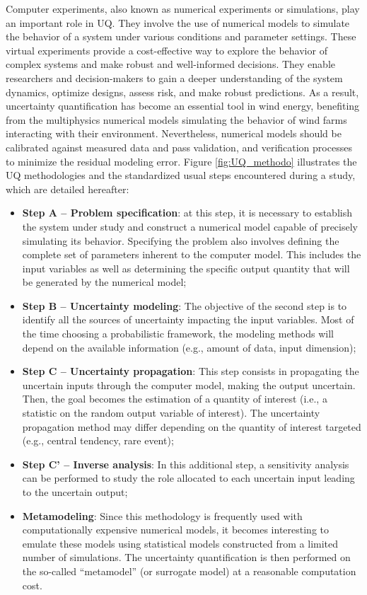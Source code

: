 Computer experiments, also known as numerical experiments or simulations, play an important role in UQ. 
They involve the use of numerical models to simulate the behavior of a system under various conditions and parameter settings. 
These virtual experiments provide a cost-effective way to explore the behavior of complex systems and make robust and well-informed decisions.
They enable researchers and decision-makers to gain a deeper understanding of the system dynamics, optimize designs, assess risk, and make robust predictions. 
As a result, uncertainty quantification has become an essential tool in wind energy, benefiting from the multiphysics numerical models simulating the behavior of wind farms interacting with their environment.
Nevertheless, numerical models should be calibrated against measured data and pass validation, and verification processes to minimize the residual modeling error.
Figure \ref{fig:UQ_methodo} illustrates the UQ methodologies and the standardized usual steps encountered during a study, which are detailed hereafter: 
\begin{itemize}
    \item \textbf{Step A -- Problem specification}: at this step, it is necessary to establish the system under study and construct a numerical model capable of precisely simulating its behavior.
    Specifying the problem also involves defining the complete set of parameters inherent to the computer model. 
    This includes the input variables as well as determining the specific output quantity that will be generated by the numerical model;
    \item \textbf{Step B -- Uncertainty modeling}: The objective of the second step is to identify all the sources of uncertainty impacting the input variables.
    Most of the time choosing a probabilistic framework, the modeling methods will depend on the available information (e.g., amount of data, input dimension);
    \item \textbf{Step C -- Uncertainty propagation}: This step consists in propagating the uncertain inputs through the computer model, making the output uncertain. 
    Then, the goal becomes the estimation of a quantity of interest (i.e., a statistic on the random output variable of interest).
    The uncertainty propagation method may differ depending on the quantity of interest targeted (e.g., central tendency, rare event);    
    \item \textbf{Step C' -- Inverse analysis}: In this additional step, a sensitivity analysis can be performed to study the role allocated to each uncertain input leading to the uncertain output;    
    \item \textbf{Metamodeling}: Since this methodology is frequently used with computationally expensive numerical models, it becomes interesting to emulate these models using statistical models constructed from a limited number of simulations.
    The uncertainty quantification is then performed on the so-called ``metamodel'' (or surrogate model) at a reasonable computation cost.
\end{itemize}


